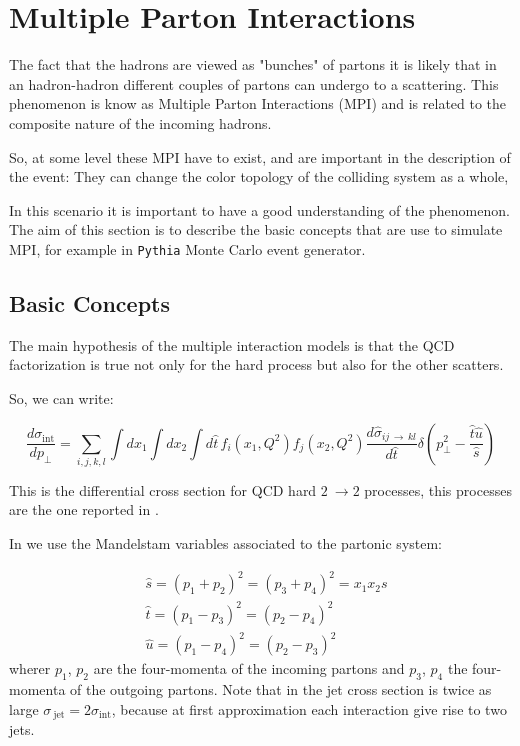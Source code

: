 
\chapter{Multiple Parton Interactions}



The fact that the hadrons are viewed as "bunches" of partons it is likely that in an hadron-hadron different couples of partons can undergo to a scattering. This phenomenon is know as Multiple Parton Interactions (MPI) and is related to the composite nature of the incoming hadrons. 

So, at some level these MPI have to exist, and are important in the description of the event: They can change the color topology of the colliding system as a whole,  

In this scenario it is important to have a good understanding of the phenomenon. The aim of this section is to describe the basic concepts that are use to simulate MPI, for example in \texttt{Pythia} Monte Carlo event generator.

\section{Basic Concepts}

The main hypothesis of the multiple interaction models is that the QCD factorization is true not only for the hard process but also for the other scatters.

So, we can write:

\begin{equation}
	\frac{d\sigma_{\text{int}}}{dp_\perp}=\displaystyle\sum_{i,j,k,l}\displaystyle\int dx_1 \displaystyle\int dx_2 \displaystyle\int d\hat{t}\, f_i(x_1,Q^2)f_j(x_2,Q^2)\frac{d\hat{\sigma}_{ij\,\rightarrow\,kl}}{d\hat{t}}\delta\left( p_\perp^2-\frac{\hat{t}\hat{u}}{\hat{s}} \right)
	\label{eq:sigma_int1}
\end{equation}


This is the differential cross section for QCD hard $2\ \rightarrow 2$ processes, this processes are the one reported in . 

In  we use the Mandelstam variables associated to the partonic system:

\begin{align}
	&\hat{s}=(p_1+p_2)^2=(p_3+p_4)^2=x_1x_2s\\
	&\hat{t}=(p_1-p_3)^2=(p_2-p_4)^2\\
	&\hat{u}=(p_1-p_4)^2=(p_2-p_3)^2
\end{align} 
wherer $p_1$, $p_2$ are the four-momenta of the incoming partons and $p_3$, $p_4$ the four-momenta of the outgoing partons. 
Note that in  the jet cross section is twice as large $\sigma_{\ \text{jet}}=2\sigma_{\text{int}}$, because at first approximation each interaction give rise to two jets.

